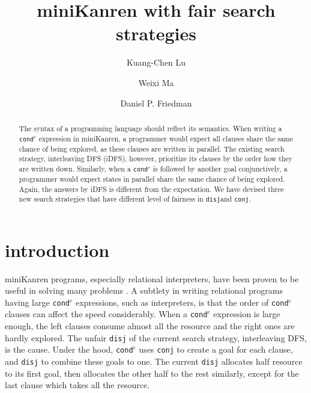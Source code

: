 \documentclass[format=acmlarge, review=true, authordraft=true]{acmart}
\title{miniKanren with fair search strategies}
\author{Kuang-Chen Lu}
\affiliation{Indiana University}
\author{Weixi Ma}
\affiliation{Indiana University}
\author{Daniel P. Friedman}
\affiliation{Indiana University}
\newcommand{\conde}{\texttt{cond$^e$} }
\newcommand{\conj}{\texttt{conj}}
\newcommand{\disj}{\texttt{disj}}
\begin{document}
\begin{abstract}

The syntax of a programming language should reflect its semantics. When writing 
a \conde expression in miniKanren, a programmer would expect all clauses share 
the same chance of being explored, as these clauses are written in 
parallel. The existing search strategy, interleaving DFS (iDFS), however, 
prioritize its clauses by the order how they are written down. Similarly, when 
a \conde is followed by another goal conjunctively, a programmer would expect 
states in parallel share the same chance of being explored. Again, the answers 
by iDFS is different from the expectation. We have devised three new search 
strategies that have different level of fairness in \disj and \conj.


\end{abstract}

\maketitle

\section{introduction}

miniKanren programs, especially relational interpreters, have been proven to be 
useful in solving many problems \citep{byrd2017unified}. A subtlety in writing 
relational programs having large \conde expressions, such as interpreters, is 
that the order of \conde clauses can affect the speed considerably. When a 
\conde expression is large enough, the left clauses consume almost all the 
resource and the right ones are hardly explored. The unfair \disj{} of the 
current search strategy, interleaving DFS, is the cause. Under the hood, \conde 
uses \texttt{conj} to create a goal for each clause, and \texttt{disj} to 
combine these goals to one. The current \texttt{disj} allocates half resource 
to its first goal, then allocates the other half to the rest similarly, except 
for the last clause which takes all the resource. 
\end{document}

